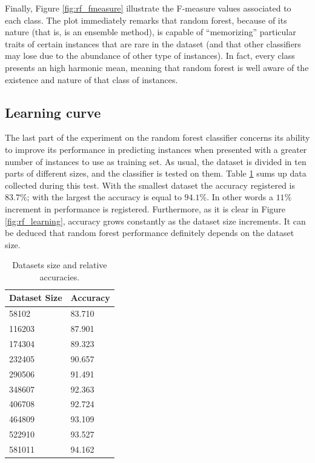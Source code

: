 \documentclass[a4paper, 10pt]{article}
\begin{document}
Finally, Figure \ref{fig:rf_fmeasure} illustrate the F-measure values associated to each class. The plot immediately remarks that random forest, because of its nature (that is, is an ensemble method), is capable of ``memorizing'' particular traits of certain instances that are rare in the dataset (and that other classifiers may lose due to the abundance of other type of instances). In fact, every class presents an high harmonic mean, meaning that random forest is well aware of the existence and nature of that class of instances.

\subsection{Learning curve}

The last part of the experiment on the random forest classifier concerns its ability to improve its performance in predicting instances when presented with a greater number of instances to use as training set. As usual, the dataset is divided in ten parts of different sizes, and the classifier is tested on them. Table \ref{tab:rf_learning} sums up data collected during this test. With the smallest dataset the accuracy registered is $83.7\%$; with the largest the accuracy is equal to $94.1\%$. In other words a $11\%$ increment in performance is registered. Furthermore, as it is clear in Figure \ref{fig:rf_learning}, accuracy grows constantly as the dataset size increments. It can be deduced that random forest performance definitely depends on the dataset size. 

\begin{table}[H]
\centering
\begin{tabular}{|l|l|}
\hline
\textbf{Dataset Size} & \textbf{Accuracy}\\\hline
58102 & 83.710\\\hline
116203 & 87.901\\\hline
174304 & 89.323\\\hline
232405 & 90.657\\\hline
290506 & 91.491\\\hline
348607 & 92.363\\\hline
406708 & 92.724\\\hline
464809 & 93.109\\\hline
522910 & 93.527\\\hline
581011 & 94.162\\\hline
\end{tabular}
\caption{Datasets size and relative accuracies.}
\label{tab:rf_learning}
\end{table}
\end{document}
